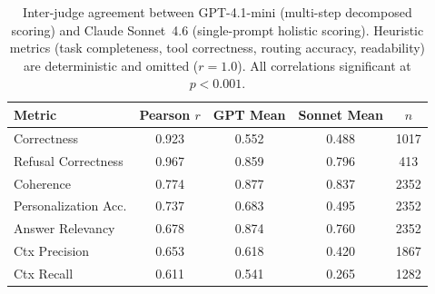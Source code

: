 \begin{table}[t]
\centering
\small
\caption{Inter-judge agreement between GPT-4.1-mini (multi-step decomposed scoring) and Claude Sonnet~4.6 (single-prompt holistic scoring). Heuristic metrics (task completeness, tool correctness, routing accuracy, readability) are deterministic and omitted ($r = 1.0$). All correlations significant at $p < 0.001$.}
\label{tab:judges}
\begin{tabular}{@{}lcccc@{}}
\toprule
Metric & Pearson $r$ & GPT Mean & Sonnet Mean & $n$ \\
\midrule
Correctness & 0.923 & 0.552 & 0.488 & 1017 \\
Refusal Correctness & 0.967 & 0.859 & 0.796 & 413 \\
Coherence & 0.774 & 0.877 & 0.837 & 2352 \\
Personalization Acc. & 0.737 & 0.683 & 0.495 & 2352 \\
Answer Relevancy & 0.678 & 0.874 & 0.760 & 2352 \\
Ctx Precision & 0.653 & 0.618 & 0.420 & 1867 \\
Ctx Recall & 0.611 & 0.541 & 0.265 & 1282 \\
\bottomrule
\end{tabular}
\end{table}
